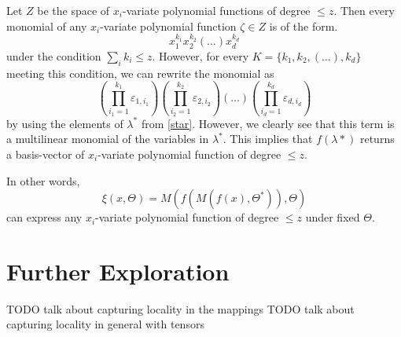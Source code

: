 \documentclass[11pt]{article}
\begin{document}
Let $Z$ be the space of $x_i$-variate polynomial functions 
of degree $\leq z$. Then every monomial of any $x_i$-variate polynomial function
$\zeta \in Z$ is of the form.
\begin{equation}
    x_{1}^{k_1}x_{2}^{k_2}(\dots)x_{d}^{k_d}
\end{equation}
under the condition $\sum_{i}k_i \leq z$. 
However, for every $K = \{k_1, k_2, (\dots), k_d\}$ meeting this condition,
we can rewrite the monomial as
\begin{equation}
    \left( \prod_{i_1=1}^{k_1}\varepsilon_{1, i_1} \right)
    \left( \prod_{i_2=1}^{k_2}\varepsilon_{2, i_2} \right)
    \left( \dots \right)
    \left( \prod_{i_d=1}^{k_d}\varepsilon_{d, i_d} \right)
\end{equation}
by using the elements of $\lambda^*$ from \eqref{star}.
However, we clearly see that this term is a multilinear 
monomial of the variables in $\lambda^*$. This implies that
$f(\lambda*)$ returns a basis-vector of $x_i$-variate polynomial 
function of degree $\leq z$.

In other words, 
\begin{equation}
    \xi \left( x, \Theta \right) =
        M
        \left(
            f
            \left(
                M
                \left(
                    f
                    \left(
                        x 
                    \right),
                    \Theta^*
                \right)
            \right),
            \Theta
        \right)
\end{equation}
can express any $x_i$-variate polynomial function of degree $\leq z$ under
fixed $\Theta$.

\section{Further Exploration}
TODO talk about capturing locality in the mappings
TODO talk about capturing locality in general with tensors


\printbibliography
\end{document}
